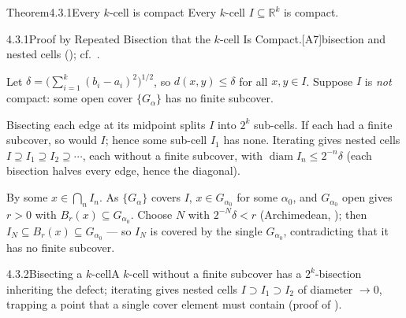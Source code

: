 \documentclass[main.tex]{subfiles}
\begin{document}
\begin{Obj}{Theorem}{4.3.1}{Every $k$-cell is compact}
Every $k$-cell $I\subseteq\mathbb R^k$ is compact.
\end{Obj}
\begin{Prf}{4.3.1}{Proof by Repeated Bisection that the $k$-cell Is Compact.}{[A7]\quad bisection and nested cells (); cf.\ .}
\item Let $\delta=\big(\sum_{i=1}^k(b_i-a_i)^2\big)^{1/2}$, so $d(x,y)\le\delta$ for all $x,y\in I$.
  Suppose $I$ is \emph{not} compact: some open cover $\{G_\alpha\}$ has no finite subcover.
\item Bisecting each edge at its midpoint splits $I$ into $2^k$ sub-cells. If each had a finite
  subcover, so would $I$; hence some sub-cell $I_1$ has none. Iterating gives nested cells
  $I\supseteq I_1\supseteq I_2\supseteq\cdots$, each without a finite subcover, with
  $\operatorname{diam}I_n\le 2^{-n}\delta$ (each bisection halves every edge, hence the diagonal).
\item By  some $x\in\bigcap_n I_n$. As $\{G_\alpha\}$ covers $I$, $x\in G_{\alpha_0}$ for
  some $\alpha_0$, and $G_{\alpha_0}$ open gives $r>0$ with $B_r(x)\subseteq G_{\alpha_0}$. Choose $N$
  with $2^{-N}\delta<r$ (Archimedean, ); then $I_N\subseteq B_r(x)\subseteq G_{\alpha_0}$
  --- so $I_N$ is covered by the single $G_{\alpha_0}$, contradicting that it has no finite subcover.
\end{Prf}

\begin{Fig}{4.3.2}{Bisecting a $k$-cell}{A $k$-cell without a finite subcover has a $2^k$-bisection inheriting the defect; iterating gives nested cells $I\supset I_1\supset I_2$ of diameter $\to0$, trapping a point that a single cover element must contain (proof of ).}
\end{Fig}
\end{document}
